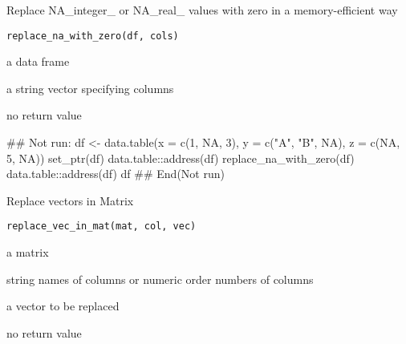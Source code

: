 \documentclass[letterpaper]{book}
\begin{document}
%
\begin{Description}
Replace NA\_integer\_ or NA\_real\_ values with zero in a memory-efficient way
\end{Description}
%
\begin{Usage}
\begin{verbatim}
replace_na_with_zero(df, cols)
\end{verbatim}
\end{Usage}
%
\begin{Arguments}
\begin{ldescription}
\item[\code{df}] a data frame

\item[\code{cols}] a string vector specifying columns
\end{ldescription}
\end{Arguments}
%
\begin{Value}
no return value
\end{Value}
%
\begin{Examples}
\begin{ExampleCode}
## Not run: 
df <- data.table(x = c(1, NA, 3), y = c("A", "B", NA), z = c(NA, 5, NA))
set_ptr(df)
data.table::address(df)
replace_na_with_zero(df)
data.table::address(df)
df
## End(Not run)

\end{ExampleCode}
\end{Examples}
%
\begin{Description}
Replace vectors in Matrix
\end{Description}
%
\begin{Usage}
\begin{verbatim}
replace_vec_in_mat(mat, col, vec)
\end{verbatim}
\end{Usage}
%
\begin{Arguments}
\begin{ldescription}
\item[\code{mat}] a matrix

\item[\code{col}] string names of columns or numeric order numbers of columns

\item[\code{vec}] a vector to be replaced
\end{ldescription}
\end{Arguments}
%
\begin{Value}
no return value
\end{Value}
\end{document}
